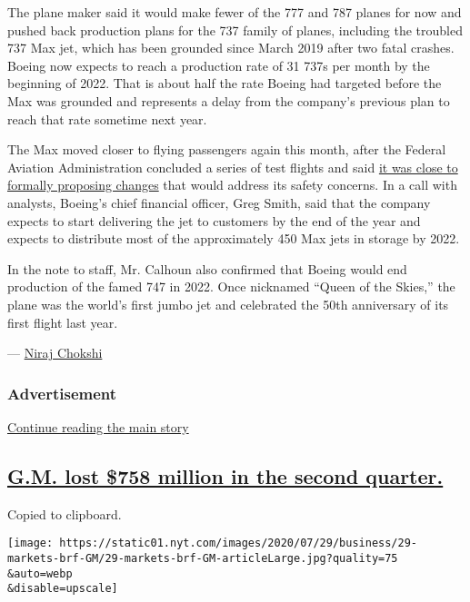 The plane maker said it would make fewer of the 777 and 787 planes for
now and pushed back production plans for the 737 family of planes,
including the troubled 737 Max jet, which has been grounded since March
2019 after two fatal crashes. Boeing now expects to reach a production
rate of 31 737s per month by the beginning of 2022. That is about half
the rate Boeing had targeted before the Max was grounded and represents
a delay from the company's previous plan to reach that rate sometime
next year.

The Max moved closer to flying passengers again this month, after the
Federal Aviation Administration concluded a series of test flights and
said
\href{https://www.nytimes.com/live/2020/07/21/business/stock-market-today-coronavirus\#the-faa-moves-the-boeing-737-max-one-step-closer-to-flying-again}{it
was close to formally proposing changes} that would address its safety
concerns. In a call with analysts, Boeing's chief financial officer,
Greg Smith, said that the company expects to start delivering the jet to
customers by the end of the year and expects to distribute most of the
approximately 450 Max jets in storage by 2022.

In the note to staff, Mr. Calhoun also confirmed that Boeing would end
production of the famed 747 in 2022. Once nicknamed ``Queen of the
Skies,'' the plane was the world's first jumbo jet and celebrated the
50th anniversary of its first flight last year.

--- \href{https://www.nytimes.com/by/niraj-chokshi}{Niraj Chokshi}

\hypertarget{advertisement-3}{%
\subsubsection{Advertisement}\label{advertisement-3}}

\protect\hyperlink{after-dfp-ad-mid4}{Continue reading the main story}

\hypertarget{gm-lost-758-million-in-the-second-quarter}{%
\subsection{\texorpdfstring{\protect\hyperlink{gm-lost-758-million-in-the-second-quarter}{G.M.
lost \$758 million in the second
quarter.}}{G.M. lost \$758 million in the second quarter.}}\label{gm-lost-758-million-in-the-second-quarter}}

Copied to clipboard.

\texttt{[image: https://static01.nyt.com/images/2020/07/29/business/29-markets-brf-GM/29-markets-brf-GM-articleLarge.jpg?quality=75\\\&auto=webp\\\&disable=upscale]}

